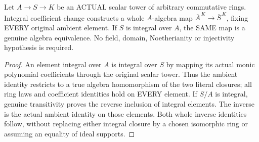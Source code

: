 \begin{theorem}
\label{algebra:actual-same-ambient-integral-closure-map}
Let $A\to S\to K$ be an ACTUAL scalar tower of arbitrary
commutative rings. Integral coefficient change constructs a
whole $A$-algebra map
$\overline A^{\,K}\to\overline S^{\,K}$, fixing EVERY
original ambient element. If $S$ is integral over $A$, the SAME
map is a genuine algebra equivalence. No field, domain,
Noetherianity or injectivity hypothesis is required.
\leanok
\end{theorem}
\begin{proof}
An element integral over $A$ is integral over $S$ by mapping
its actual monic polynomial coefficients through the original
scalar tower. Thus the ambient identity restricts to a true
algebra homomorphism of the two literal closures; all ring laws
and coefficient identities hold on EVERY element. If $S/A$
is integral, genuine transitivity proves the reverse inclusion
of integral elements. The inverse is the actual ambient identity
on those elements. Both whole inverse identities follow,
without replacing either integral closure by a chosen isomorphic
ring or assuming an equality of ideal supports.
\end{proof}

